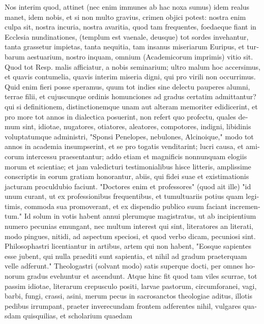 \begin{latin}
Nos interim quod, attinet (nec enim immunes ab hac noxa sumus) idem realus
manet, idem nobis, et si non multo gravius, crimen objici potest: nostra enim
culpa sit, nostra incuria, nostra avaritia, quod tam frequentes, foedaeque
fiant in Ecclesia nundinationes, (templum est vaenale, deusque) tot sordes
invehantur, tanta grassetur impietas, tanta nequitia, tam insanus miseriarum
Euripus, et turbarum aestuarium, nostro inquam, omnium (Academicorum
imprimis) vitio sit. Quod tot Resp. malis afficiatur, a nobis seminarium;
ultro malum hoc accersimus, et quavis contumelia, quavis interim miseria
digni, qui pro virili non occurrimus. Quid enim fieri posse speramus, quum
tot indies sine delectu pauperes alumni, terrae filii, et cujuscunque ordinis
homunciones ad gradus certatim admittantur? qui si definitionem,
distinctionemque unam aut alteram memoriter edidicerint, et pro more tot
annos in dialectica posuerint, non refert quo profectu, quales demum sint,
idiotae, nugatores, otiatores, aleatores, compotores, indigni, libidinis
voluptatumque administri, "Sponsi Penelopes, nebulones, Alcinoique," modo tot
annos in academia insumpserint, et se pro togatis venditarint; lucri causa,
et amicorum intercessu praesentantur; addo etiam et magnificis nonnunquam
elogiis morum et scientiae; et jam valedicturi testimonialibus hisce
litteris, amplissime conscriptis in eorum gratiam honorantur, abiis, qui
fidei suae et existimationis jacturam proculdubio faciunt. "Doctores enim et
professores" (quod ait ille) "id unum curant, ut ex
professionibus frequentibus, et tumultuariis potius quam legitimis, commoda
sua promoverant, et ex dispendio publico suum faciant incrementum." Id solum
in votis habent annui plerumque magistratus, ut ab incipientium numero
pecunias emungant, nec multum interest qui sint,
literatores an literati, modo pingues, nitidi, ad aspectum speciosi, et quod
verbo dicam, pecuniosi sint. Philosophastri licentiantur
in artibus, artem qui non habent, "Eosque sapientes esse
jubent, qui nulla praediti sunt sapientia, et nihil ad gradum praeterquam
velle adferunt." Theologastri (solvant modo) satis superque docti, per omnes
honorum gradus evehuntur et ascendunt. Atque hinc fit quod tam viles scurrae,
tot passim idiotae, literarum crepusculo positi, larvae pastorum,
circumforanei, vagi, barbi, fungi, crassi, asini, merum pecus in sacrosanctos
theologiae aditus, illotis pedibus irrumpant, praeter inverecundam frontem
adferentes nihil, vulgares quasdam quisquilias, et scholarium quaedam

\end{latin}
